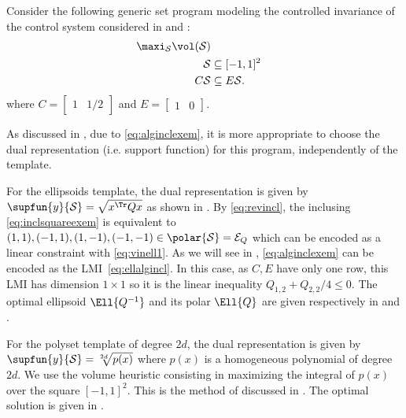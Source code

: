 \documentclass[11pt,twoside,a4paper,openright]{uclouvain-thesis}
\begin{document}
\begin{myexem}
  \label{exem:simplesetprog}
  Consider the following generic set program modeling the controlled
  invariance of the control system considered in  and :
  \begin{align}
    \notag
    \maxi_{\mathcal{S}} \vol(\mathcal{S})\\
    \label{eq:inclsquareexem}
    \mathcal{S} & \subseteq [-1, 1]^2\\
    \label{eq:alginclexem}
    C\mathcal{S} & \subseteq E\mathcal{S}.
  \end{align}
  where
  \(
    C =
    \begin{bmatrix}
      1 & 1/2
    \end{bmatrix}
  \)
  and
  \(
    E =
    \begin{bmatrix}
      1 & 0
    \end{bmatrix}
  \).

  As discussed in , due to \eqref{eq:alginclexem},
  it is more appropriate to choose the dual representation (i.e. support function)
  for this program, independently of the template.

  For the ellipsoids template, the dual representation is given by
  $\supfun{y}{\mathcal{S}} = \sqrt{x^\Tr Q x}$ as shown in .
  By \eqref{eq:revincl},
  the inclusing \eqref{eq:inclsquareexem} is equivalent to
  $(1, 1), (-1, 1), (1, -1), (-1, -1) \in \polar{\mathcal{S}} = \mathcal{E}_{Q}$
  which can be encoded as a linear constraint with \eqref{eq:vinell1}.
  As we will see in ,
  \eqref{eq:alginclexem} can be encoded as the LMI~\eqref{eq:ellalgincl}.
  In this case, as $C, E$ have only one row, this LMI has dimension $1 \times 1$
  so it is the linear inequality $Q_{1,2} + Q_{2,2}/4 \le 0$.
  The optimal ellipsoid $\Ell{Q^{-1}}$ and its polar $\Ell{Q}$ are given
  respectively in 
  and .

  For the polyset template of degree $2d$, the dual representation is given by
  $\supfun{y}{\mathcal{S}} = \sqrt[2d]{p(x)}$ where $p(x)$ is a homogeneous
  polynomial of degree $2d$.
  We use the volume heuristic
  consisting in maximizing the integral of $p(x)$ over the square $[-1, 1]^2$.
  This is the method of \cite{dabbene2017simple} discussed in .
  The optimal solution is given in .


\end{myexem}
\end{document}
